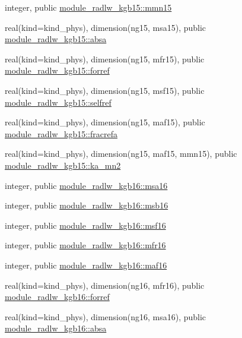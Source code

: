 \begin{DoxyCompactItemize}
integer, public \hyperlink{namespacemodule__radlw__kgb15_a8ab45999cfc7b9db0f3d3b61ccf803e8}{module\+\_\+radlw\+\_\+kgb15\+::mmn15}
\item 
real(kind=kind\+\_\+phys), dimension(ng15, msa15), public \hyperlink{namespacemodule__radlw__kgb15_aa6412ac501e2afed3d1b64b0cdcdab9e}{module\+\_\+radlw\+\_\+kgb15\+::absa}
\item 
real(kind=kind\+\_\+phys), dimension(ng15, mfr15), public \hyperlink{namespacemodule__radlw__kgb15_ada70146d20f89f059141aa4cf58a0894}{module\+\_\+radlw\+\_\+kgb15\+::forref}
\item 
real(kind=kind\+\_\+phys), dimension(ng15, msf15), public \hyperlink{namespacemodule__radlw__kgb15_a1d14e9b2e607f2022d84c6fc0cd27c4e}{module\+\_\+radlw\+\_\+kgb15\+::selfref}
\item 
real(kind=kind\+\_\+phys), dimension(ng15, maf15), public \hyperlink{namespacemodule__radlw__kgb15_a4b5c5f6fd9ea806843adf78ec1b43cd2}{module\+\_\+radlw\+\_\+kgb15\+::fracrefa}
\item 
real(kind=kind\+\_\+phys), dimension(ng15, maf15, mmn15), public \hyperlink{namespacemodule__radlw__kgb15_aff32d89fe8fef50ff79136cc7aa50526}{module\+\_\+radlw\+\_\+kgb15\+::ka\+\_\+mn2}
\item 
integer, public \hyperlink{namespacemodule__radlw__kgb16_a95bf5395b579ca6619de3fc40c7ded79}{module\+\_\+radlw\+\_\+kgb16\+::msa16}
\item 
integer, public \hyperlink{namespacemodule__radlw__kgb16_a18ad5b461d6c71b1aa2d82d5694beb03}{module\+\_\+radlw\+\_\+kgb16\+::msb16}
\item 
integer, public \hyperlink{namespacemodule__radlw__kgb16_a8601911604c1d6a1b32e434159ae95d2}{module\+\_\+radlw\+\_\+kgb16\+::msf16}
\item 
integer, public \hyperlink{namespacemodule__radlw__kgb16_a82777667b951207c62955e3e1492d79d}{module\+\_\+radlw\+\_\+kgb16\+::mfr16}
\item 
integer, public \hyperlink{namespacemodule__radlw__kgb16_aae4c96f4a2ae49c573189f2d63ccd4a3}{module\+\_\+radlw\+\_\+kgb16\+::maf16}
\item 
real(kind=kind\+\_\+phys), dimension(ng16, mfr16), public \hyperlink{namespacemodule__radlw__kgb16_a4402ed68e18459813a6c9ede5d6ba9cc}{module\+\_\+radlw\+\_\+kgb16\+::forref}
\item 
real(kind=kind\+\_\+phys), dimension(ng16, msa16), public \hyperlink{namespacemodule__radlw__kgb16_a2734b420b7e8e8393a8bf1b595a3cf09}{module\+\_\+radlw\+\_\+kgb16\+::absa}
\item 

\end{DoxyCompactItemize}
